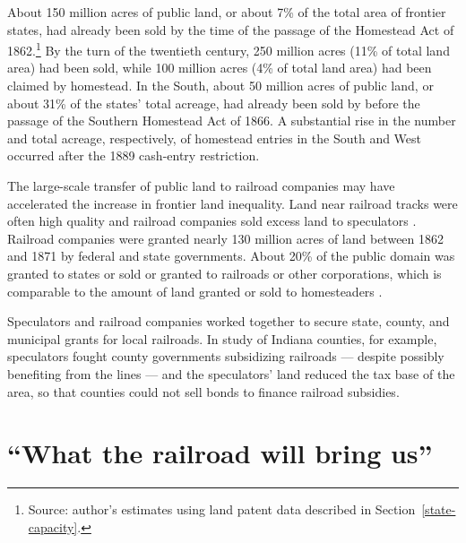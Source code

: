 About 150 million acres of public land, or about 7\% of the total area of frontier states, had already been sold by the time of the passage of the Homestead Act of 1862.\footnote{Source: author's estimates using land patent data described in Section~\ref{state-capacity}.} By the turn of the twentieth century, 250 million acres (11\% of total land area) had been sold, while 100 million acres (4\% of total land area) had been claimed by homestead. In the South, about 50 million acres of public land, or about 31\% of the states' total acreage, had already been sold by before the passage of the Southern Homestead Act of 1866. A substantial rise in the number and total acreage, respectively, of homestead entries in the South and West occurred after the 1889 cash-entry restriction.

The large-scale transfer of public land to railroad companies may have accelerated the increase in frontier land inequality. Land near railroad tracks were often high quality and railroad companies sold excess land to speculators \citep{murtazashvili2013political}. Railroad companies were granted nearly 130 million acres of land between 1862 and 1871 by federal and state governments. About 20\% of the public domain was granted to states or sold or granted to railroads or other corporations, which is comparable to the amount of land granted or sold to homesteaders \citep{shanks2005homestead}.

Speculators and railroad companies worked together to secure state, county, and municipal grants for local railroads. In  study of Indiana counties, for example, speculators fought county governments subsidizing railroads --- despite possibly benefiting from the lines --- and the speculators' land reduced the tax base of the area, so that counties could not sell bonds to finance railroad subsidies. 

\section{``What the railroad will bring us''} 


